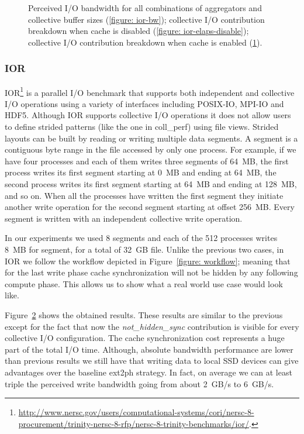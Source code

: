 \begin{figure}[]
\begin{subfigure}[]{\textwidth}
  \caption{}
  \label{figure: ior-elaps-enable}
  \end{subfigure}
  \caption{Perceived I/O bandwidth for all combinations of aggregators and collective buffer sizes (\ref{figure: ior-bw}); collective I/O contribution breakdown when cache is 
  disabled (\ref{figure: ior-elaps-disable}); collective I/O contribution breakdown when cache is enabled (\ref{figure: ior-elaps-enable}).}
  \label{figure: ior-results}
\end{figure}

\subsubsection{IOR}
IOR\footnote{\url{http://www.nersc.gov/users/computational-systems/cori/nersc-8-procurement/trinity-nersc-8-rfp/nersc-8-trinity-benchmarks/ior/}.} is a parallel I/O benchmark that supports 
both independent and collective I/O operations using a variety of interfaces including POSIX-IO, MPI-IO and HDF5. Although IOR supports collective I/O operations it does not allow
users to define strided patterns (like the one in coll\_perf) using file views. Strided layouts can be built by reading or writing multiple data segments. A segment is a contiguous byte 
range in the file accessed by only one process. For example, if we have four processes and each of them writes three segments of 64~MB, the first process writes its first segment
starting at 0~MB and ending at 64~MB, the second process writes its first segment starting at 64~MB and ending at 128~MB, and so on.
When all the processes have written the first segment they initiate another write operation for the second segment starting at offset 256~MB. Every segment is written with an independent
collective write operation.

In our experiments we used 8 segments and each of the 512 processes writes 8~MB for segment, for a total of 32~GB file. Unlike the previous two cases, in IOR we follow the workflow
depicted in Figure~\ref{figure: workflow}; meaning that for the last write phase cache synchronization will not be hidden by any following compute phase. This allows us to show what 
a real world use case would look like.

Figure~\ref{figure: ior-results} shows the obtained results. These results are similar to the previous except for the fact that now the \textit{not\_hidden\_sync} contribution is
visible for every collective I/O configuration. The cache synchronization cost represents a huge part of the total I/O time. Although, absolute bandwidth performance are lower 
than previous results we still have that writing data to local SSD devices can give advantages over the baseline ext2ph strategy. In fact, on average we can at least triple the 
perceived write bandwidth going from about 2~GB/s to 6~GB/s.

